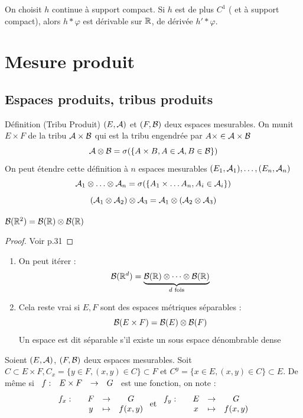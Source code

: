 \documentclass[]{report}
\begin{document}
\begin{ex}{}{}
    On choisit $h$ continue à support compact. Si $h$ est de plus $C^1$ ( et à support compact), alors $h\ast\varphi$ est dérivable sur $\mathbb{R}$, de dérivée $h'\ast\varphi$.
\end{ex}

\chapter{Mesure produit}

\section{Espaces produits, tribus produits}

\begin{df}{Définition (Tribu Produit)}{}
    $(E,\mathcal{A})$ et $(F,\mathcal{B})$ deux espaces mesurables. On munit $E\times F$ de la tribu $\mathcal{A}\times \mathcal{B}$ qui est la tribu engendrée par $A\times\in \mathcal{A}\times \mathcal{B}$
    \[\mathcal{A}\otimes\mathcal{B}=\sigma(\{A\times B,A\in\mathcal{A},B\in\mathcal{B}\})\]
    On peut étendre cette définition à $n$ espaces mesurables $(E_1,\mathcal{A}_1),\ldots,(E_n,\mathcal{A}_n)$
    \[\mathcal{A}_1\otimes\ldots\otimes\mathcal{A}_n=\sigma(\{A_1\times \ldots A_n,A_i\in\mathcal{A}_i\})\]
    \[(\mathcal{A}_1\otimes\mathcal{A}_2)\otimes\mathcal{A}_3=\mathcal{A}_1\otimes(\mathcal{A}_2\otimes\mathcal{A}_3)\]
\end{df}

\begin{prop}{}{}
    $\mathcal{B}(\mathbb{R}^2)=\mathcal{B}(\mathbb{R})\otimes\mathcal{B}(\mathbb{R})$
\end{prop}

\begin{proof}{}{}
    Voir p.31
\end{proof}

\begin{re}{}{}
    \begin{enumerate}
        \item On peut itérer :
        \[\mathcal{B}(\mathbb{R}^d)=\underset{d\text{ fois}}{\underbrace{\mathcal{B}(\mathbb{R})\otimes\cdots\otimes\mathcal{B}(\mathbb{R})}}\]
        \item Cela reste vrai si $E,F$ sont des espaces métriques séparables :
        \[\mathcal{B}(E\times F)=\mathcal{B}(E)\otimes\mathcal{B}(F)\]
        Un espace est dit séparable s'il existe un sous espace dénombrable dense
    \end{enumerate}
\end{re}

\begin{prop}{}{}
    Soient $(E,\mathcal{A})$, $(F,\mathcal{B})$ deux espaces mesurables.
    Soit $C\subset E\times F,C_x=\{y\in F,(x,y)\in C\}\subset F$ et $C^y=\{x\in E,(x,y)\in C\}\subset E$.
    De même si $\begin{array}{ccccc} f : & E\times F & \to & G \end{array}$ est une fonction, on note :
    \[\begin{array}{ccccc} f_x : & & F & \to & G \\ & & y & \mapsto & f(x,y) \end{array}\text{ et }\begin{array}{ccccc} f_y : & & E & \to & G \\ & & x & \mapsto & f(x,y) \end{array}\]
\end{prop}
\end{document}
